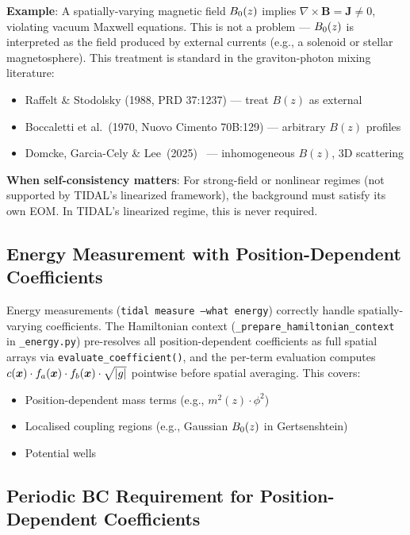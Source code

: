 \textbf{Example}: A spatially-varying magnetic field $B_0(z)$ implies $\nabla\times\bm{B} = \bm{J} \neq 0$, violating
vacuum Maxwell equations. This is not a problem --- $B_0(z)$ is interpreted as the field
produced by external currents (e.g., a solenoid or stellar magnetosphere). This treatment
is standard in the graviton-photon mixing literature:
\begin{itemize}
  \item Raffelt \& Stodolsky (1988, PRD 37:1237) --- treat $B(z)$ as external
  \item Boccaletti et al.\ (1970, Nuovo Cimento 70B:129) --- arbitrary $B(z)$ profiles
  \item Domcke, Garcia-Cely \& Lee~(2025)~\cite{domcke2025scattering} --- inhomogeneous $B(z)$, 3D scattering
\end{itemize}

\textbf{When self-consistency matters}: For strong-field or nonlinear regimes (not supported
by TIDAL's linearized framework), the background must satisfy its own EOM. In TIDAL's
linearized regime, this is never required.

\subsection{Energy Measurement with Position-Dependent Coefficients}
\label{sec:bg-energy}

Energy measurements (\texttt{tidal measure --what energy}) correctly handle
spatially-varying coefficients. The Hamiltonian context
(\texttt{\_prepare\_hamiltonian\_context} in \texttt{\_energy.py}) pre-resolves all
position-dependent coefficients as full spatial arrays via
\texttt{evaluate\_coefficient()}, and the per-term evaluation computes
$c(\bm{x}) \cdot f_a(\bm{x}) \cdot f_b(\bm{x}) \cdot \sqrt{|g|}$ pointwise before spatial
averaging. This covers:

\begin{itemize}
  \item Position-dependent mass terms (e.g., $m^2(z) \cdot \phi^2$)
  \item Localised coupling regions (e.g., Gaussian $B_0(z)$ in Gertsenshtein)
  \item Potential wells
\end{itemize}

\subsection{Periodic BC Requirement for Position-Dependent Coefficients}
\label{sec:bg-periodic-bc}

